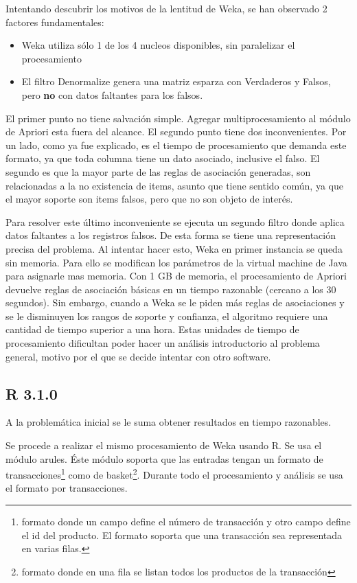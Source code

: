\documentclass[journal]{IEEEtran}
\begin{document}
Intentando descubrir los motivos de la lentitud de Weka, se han observado 2 factores fundamentales:
\begin{itemize}
	\item Weka utiliza sólo 1 de los 4 nucleos disponibles, sin paralelizar el procesamiento
	\item El filtro Denormalize genera una matriz esparza con Verdaderos y Falsos, pero \textbf{no} con
	datos faltantes para los falsos. 
\end{itemize}

El primer punto no tiene salvación simple. Agregar multiprocesamiento al módulo de Apriori esta
fuera del alcance.
El segundo punto tiene dos inconvenientes. Por un lado, como ya fue explicado, es el tiempo de 
procesamiento que demanda este formato, ya que toda columna tiene un dato asociado, inclusive el falso. 
El segundo es que la mayor parte de las reglas de asociación
generadas, son relacionadas a la no existencia de items, asunto que tiene sentido común, ya que
el mayor soporte son items falsos, pero que no son objeto de interés. 

Para resolver este último inconveniente se ejecuta un segundo filtro donde aplica datos faltantes 
a los registros falsos. De esta forma se tiene una representación precisa del problema. Al intentar 
hacer esto, Weka en primer instancia se queda sin memoria. Para ello se modifican los parámetros de
la virtual machine de Java para asignarle mas memoria. Con 1 GB de memoria, el procesamiento de
Apriori devuelve reglas de asociación básicas en un tiempo razonable (cercano a los 30 segundos). 
Sin embargo, cuando a Weka se le piden más reglas de asociaciones y se le disminuyen los rangos de 
soporte y confianza, el algoritmo requiere una cantidad de tiempo superior a una hora. Estas unidades
de tiempo de procesamiento dificultan poder hacer un análisis introductorio al problema general,
motivo por el que se decide intentar con otro software.


\subsection{R 3.1.0}
A la problemática inicial se le suma obtener resultados en tiempo razonables. 

Se procede a realizar el mismo procesamiento de Weka usando R. Se usa el módulo arules. Éste 
módulo soporta que las entradas tengan un formato de transacciones\footnote{formato donde un 
campo define el número de transacción y otro campo define el id del producto. El formato
soporta que una transacción sea representada en varias filas.}
como de basket\footnote{formato donde en una fila se listan todos los productos de la transacción}.
Durante todo el procesamiento y análisis se usa el formato por transacciones.
\end{document}
